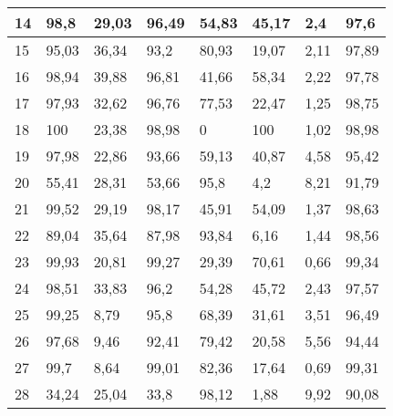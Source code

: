 \begin{longtable}[c]{|l|l|l|l|l|l|l|l|}
14              & 98,8         & 29,03        & 96,49       & 54,83         & 45,17         & 2,4           & 97,6          \\ \hline
15              & 95,03        & 36,34        & 93,2        & 80,93         & 19,07         & 2,11          & 97,89         \\ \hline
16              & 98,94        & 39,88        & 96,81       & 41,66         & 58,34         & 2,22          & 97,78         \\ \hline
17              & 97,93        & 32,62        & 96,76       & 77,53         & 22,47         & 1,25          & 98,75         \\ \hline
18              & 100          & 23,38        & 98,98       & 0             & 100           & 1,02          & 98,98         \\ \hline
19              & 97,98        & 22,86        & 93,66       & 59,13         & 40,87         & 4,58          & 95,42         \\ \hline
20              & 55,41        & 28,31        & 53,66       & 95,8          & 4,2           & 8,21          & 91,79         \\ \hline
21              & 99,52        & 29,19        & 98,17       & 45,91         & 54,09         & 1,37          & 98,63         \\ \hline
22              & 89,04        & 35,64        & 87,98       & 93,84         & 6,16          & 1,44          & 98,56         \\ \hline
23              & 99,93        & 20,81        & 99,27       & 29,39         & 70,61         & 0,66          & 99,34         \\ \hline
24              & 98,51        & 33,83        & 96,2        & 54,28         & 45,72         & 2,43          & 97,57         \\ \hline
25              & 99,25        & 8,79         & 95,8        & 68,39         & 31,61         & 3,51          & 96,49         \\ \hline
26              & 97,68        & 9,46         & 92,41       & 79,42         & 20,58         & 5,56          & 94,44         \\ \hline
27              & 99,7         & 8,64         & 99,01       & 82,36         & 17,64         & 0,69          & 99,31         \\ \hline
28              & 34,24        & 25,04        & 33,8        & 98,12         & 1,88          & 9,92          & 90,08         \\ \hline

\end{longtable}
